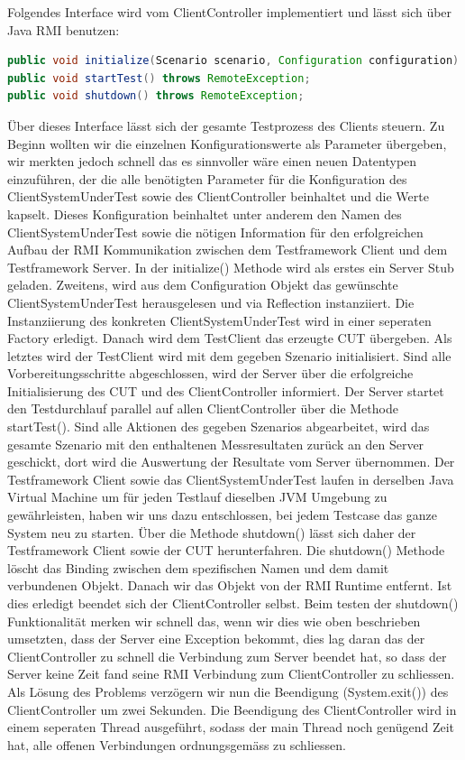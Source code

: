 Folgendes Interface wird vom ClientController implementiert und lässt sich über Java RMI benutzen:
\begin{lstlisting}[language=java, breaklines=true] 	
public void initialize(Scenario scenario, Configuration configuration) throws RemoteException;
public void startTest() throws RemoteException;
public void shutdown() throws RemoteException;
\end{lstlisting}
Über dieses Interface lässt sich der gesamte Testprozess des Clients steuern. Zu Beginn wollten wir die einzelnen Konfigurationswerte als Parameter übergeben, wir merkten jedoch schnell das es sinnvoller wäre einen neuen Datentypen einzuführen, der die alle benötigten Parameter für die Konfiguration des ClientSystemUnderTest sowie des ClientController beinhaltet und die Werte kapselt. Dieses Konfiguration beinhaltet unter anderem den Namen des ClientSystemUnderTest sowie die nötigen Information für den erfolgreichen Aufbau der RMI Kommunikation zwischen dem Testframework Client und dem Testframework Server. In der initialize() Methode wird als erstes ein Server Stub geladen. Zweitens, wird aus dem Configuration Objekt das gewünschte ClientSystemUnderTest herausgelesen und via Reflection instanziiert. Die Instanziierung des konkreten ClientSystemUnderTest wird in einer seperaten Factory erledigt. Danach wird dem TestClient das erzeugte CUT übergeben. Als letztes wird der TestClient wird mit dem gegeben Szenario initialisiert. Sind alle Vorbereitungsschritte abgeschlossen, wird der Server über die erfolgreiche Initialisierung des CUT und des ClientController informiert. Der Server startet den Testdurchlauf parallel auf allen ClientController über die Methode startTest(). Sind alle Aktionen des gegeben Szenarios abgearbeitet, wird das gesamte Szenario mit den enthaltenen Messresultaten zurück an den Server geschickt, dort wird die Auswertung der Resultate vom Server übernommen. Der Testframework Client sowie das ClientSystemUnderTest laufen in derselben Java Virtual Machine um für jeden Testlauf dieselben JVM Umgebung zu gewährleisten, haben wir uns dazu entschlossen, bei jedem Testcase das ganze System neu zu starten. Über die Methode shutdown() lässt sich daher der Testframework Client sowie der CUT herunterfahren. Die shutdown() Methode löscht das Binding zwischen dem spezifischen Namen und dem damit verbundenen Objekt. Danach wir das Objekt von der RMI Runtime entfernt. Ist dies erledigt beendet sich der ClientController selbst. Beim testen der shutdown() Funktionalität merken wir schnell das, wenn wir dies wie oben beschrieben umsetzten, dass der Server eine Exception bekommt, dies lag daran das der ClientController zu schnell die Verbindung zum Server beendet hat, so dass der Server keine Zeit fand seine RMI Verbindung zum ClientController zu schliessen. Als Lösung des Problems verzögern wir nun die Beendigung (System.exit()) des ClientController um zwei Sekunden. Die Beendigung des ClientController wird in einem seperaten Thread ausgeführt, sodass der main Thread noch genügend Zeit hat, alle offenen Verbindungen ordnungsgemäss zu schliessen.    


